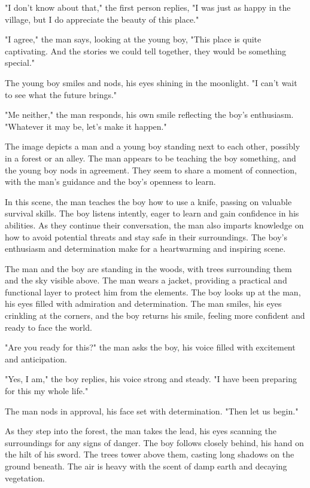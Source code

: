 \documentclass[smalldemyvopaper,11pt,twoside,onecolumn,openright,extrafontsizes]{memoir}
\begin{document}
"I don't know about that," the first person replies, "I was just as happy in the village, but I do appreciate the beauty of this place."\par
"I agree," the man says, looking at the young boy, "This place is quite captivating. And the stories we could tell together, they would be something special."\par
The young boy smiles and nods, his eyes shining in the moonlight. "I can't wait to see what the future brings."\par
"Me neither," the man responds, his own smile reflecting the boy's enthusiasm. "Whatever it may be, let's make it happen."\par
The image depicts a man and a young boy standing next to each other, possibly in a forest or an alley. The man appears to be teaching the boy something, and the young boy nods in agreement. They seem to share a moment of connection, with the man's guidance and the boy's openness to learn.\par
In this scene, the man teaches the boy how to use a knife, passing on valuable survival skills. The boy listens intently, eager to learn and gain confidence in his abilities. As they continue their conversation, the man also imparts knowledge on how to avoid potential threats and stay safe in their surroundings. The boy's enthusiasm and determination make for a heartwarming and inspiring scene.\par
The man and the boy are standing in the woods, with trees surrounding them and the sky visible above. The man wears a jacket, providing a practical and functional layer to protect him from the elements. The boy looks up at the man, his eyes filled with admiration and determination. The man smiles, his eyes crinkling at the corners, and the boy returns his smile, feeling more confident and ready to face the world.\par
"Are you ready for this?" the man asks the boy, his voice filled with excitement and anticipation.\par
"Yes, I am," the boy replies, his voice strong and steady. "I have been preparing for this my whole life."\par
The man nods in approval, his face set with determination. "Then let us begin."\par
As they step into the forest, the man takes the lead, his eyes scanning the surroundings for any signs of danger. The boy follows closely behind, his hand on the hilt of his sword. The trees tower above them, casting long shadows on the ground beneath. The air is heavy with the scent of damp earth and decaying vegetation.\par
\end{document}
